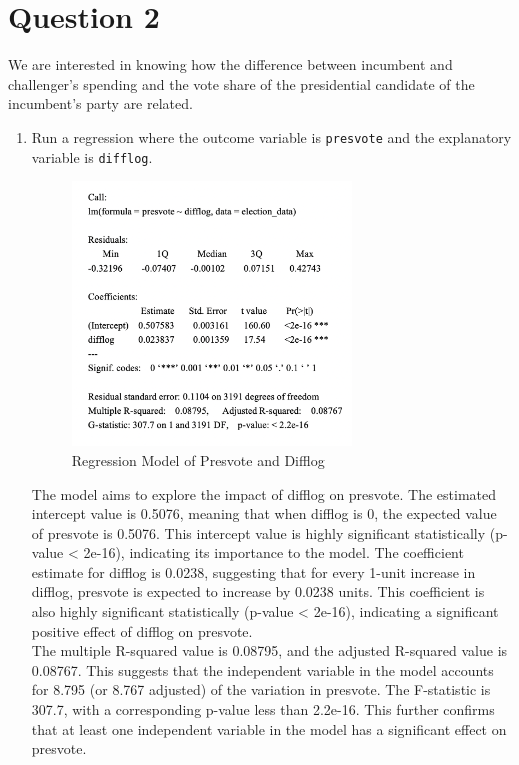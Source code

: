 \documentclass[12pt,letterpaper]{article}
\begin{document}
\section*{Question 2}
\noindent We are interested in knowing how the difference between incumbent and challenger's spending and the vote share of the presidential candidate of the incumbent's party are related.	\vspace{.25cm}
	\begin{enumerate}
		\item Run a regression where the outcome variable is \texttt{presvote} and the explanatory variable is \texttt{difflog}.	\vspace{1cm}
		
		\begin{figure}[h!]
			\caption{\footnotesize{Regression Model of Presvote and Difflog}}
			\vspace{.5cm}
			\centering
			\label{fig:2.1}
			\includegraphics[width=0.7\textwidth]{summary2.png}
		\end{figure}
		
		The model aims to explore the impact of difflog  on presvote. The estimated intercept value is 0.5076, meaning that when difflog is 0, the expected value of presvote is 0.5076. This intercept value is highly significant statistically (p-value < 2e-16), indicating its importance to the model. The coefficient estimate for difflog is 0.0238, suggesting that for every 1-unit increase in difflog, presvote is expected to increase by 0.0238 units. This coefficient is also highly significant statistically (p-value < 2e-16), indicating a significant positive effect of difflog on presvote.\\
		The multiple R-squared value is 0.08795, and the adjusted R-squared value is 0.08767. This suggests that the independent variable in the model accounts for 8.795 (or 8.767 adjusted) of the variation in presvote. The F-statistic is 307.7, with a corresponding p-value less than 2.2e-16. This further confirms that at least one independent variable in the model  has a significant effect on presvote.\\
		

\end{enumerate}
\end{document}
